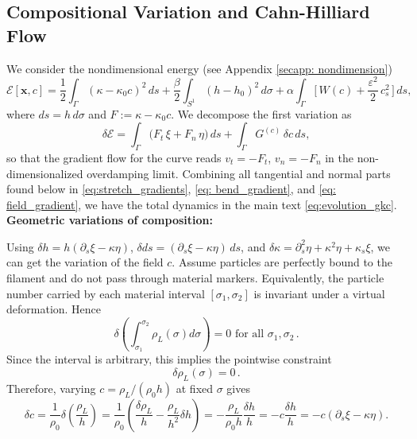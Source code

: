 \documentclass[
aip,
jcp,
reprint, 
floatfix
]{revtex4-1}
\begin{document}
\subsection{Compositional Variation and Cahn-Hilliard Flow}

We consider the nondimensional energy (see Appendix \ref{secapp: nondimension})
\begin{equation}
\mathcal{E}[\mathbf{x},c]
=\frac{1}{2}\int_\Gamma (\kappa-\kappa_0 c)^2\,ds
+\frac{\beta}{2}\int_{S^1}(h-h_0)^2\,d\sigma
+\alpha\int_\Gamma\Big[\,W(c)+\frac{\varepsilon^2}{2}\,c_s^2\,\Big]\,ds,
\label{eq:energy_full_nd_appendix}
\end{equation}
where $ds=h\,d\sigma$ and $F:=\kappa-\kappa_0 c$. We decompose the first variation as
\begin{equation}
    \delta\mathcal{E}
=\int_\Gamma\big(F_t\,\xi+F_n\,\eta\big)\,ds
+\int_\Gamma G^{(c)}\,\delta c\,ds,
\end{equation}
so that the gradient flow for the curve reads $v_t=-F_t$, $v_n=-F_n$ in the non-dimensionalized overdamping limit. Combining all tangential and normal parts found below in \eqref{eq:stretch_gradients}, \eqref{eq: bend_gradient}, and \eqref{eq: field_gradient}, we have the total dynamics in the main text \eqref{eq:evolution_gkc}.\\

{\bf Geometric variations of composition:}

Using $\delta h=h(\partial_s\xi-\kappa\eta)$, $\delta ds=(\partial_s\xi-\kappa\eta)\,ds$, and
$\delta\kappa=\partial_s^2\eta+\kappa^2\eta+\kappa_s\xi$, we can get the variation of the field $c$. Assume particles are perfectly bound to the filament and do not pass through material markers. Equivalently, the particle number carried by each material interval $\left[\sigma_1, \sigma_2\right]$ is invariant under a virtual deformation. Hence
\begin{equation}
    \delta\left(\int_{\sigma_1}^{\sigma_2} \rho_L(\sigma) d \sigma\right)=0 \text { for all } \sigma_1, \sigma_2\,.
\end{equation}
Since the interval is arbitrary, this implies the pointwise constraint
\begin{equation}
    \delta \rho_L(\sigma)=0\,.
\end{equation}
Therefore, varying $c=\rho_L /\left(\rho_0 h\right)$ at fixed $\sigma$ gives
\begin{equation}
    \delta c=\frac{1}{\rho_0} \delta\left(\frac{\rho_L}{h}\right)=\frac{1}{\rho_0}\left(\frac{\delta \rho_L}{h}-\frac{\rho_L}{h^2} \delta h\right)=-\frac{\rho_L}{\rho_0 h} \frac{\delta h}{h}=-c \frac{\delta h}{h}= -c(\partial_s\xi-\kappa\eta).
\end{equation}
\end{document}
